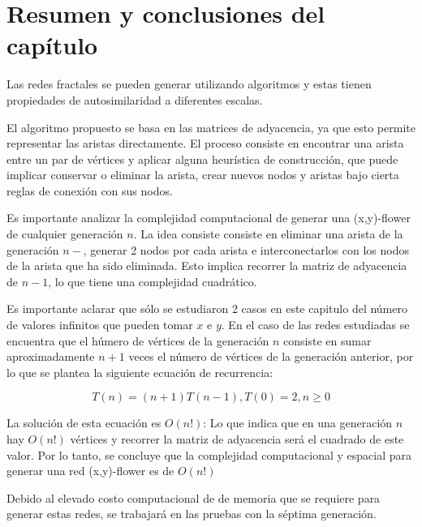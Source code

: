 \section{Resumen y conclusiones del capítulo}

Las redes fractales se pueden generar utilizando algoritmos y estas tienen propiedades de autosimilaridad a diferentes escalas.

El algoritmo propuesto se basa en las matrices de adyacencia, ya que esto permite representar las aristas directamente. El proceso consiste en encontrar una arista entre un par de vértices y aplicar alguna heurística de construcción, que puede implicar conservar o eliminar la arista, crear nuevos nodos y aristas bajo cierta reglas de conexión con sus nodos.

Es importante analizar la complejidad computacional de generar una (x,y)-flower de cualquier generación $n$. La idea consiste consiste en eliminar una arista de la generación $n-$, generar 2 nodos por cada arista e interconectarlos con los nodos de la arista que ha sido eliminada. Esto implica recorrer la matriz de adyacencia de $n-1$, lo que tiene una complejidad cuadrático.

Es importante aclarar que sólo se estudiaron 2 casos en este capitulo del número de valores infinitos que pueden tomar $x$ e $y$. En el caso de las redes estudiadas se encuentra que el húmero de vértices de la generación $n$ consiste en sumar aproximadamente $n+1$ veces el número de vértices de la generación anterior, por lo que se plantea la siguiente ecuación de recurrencia:

\begin{equation}
    T(n)=(n+1)T(n-1), T(0)=2, n \geq 0
\end{equation}

La solución de esta ecuación es $O(n!)$: Lo que indica que en una generación $n$ hay $O(n!)$ vértices y recorrer la matriz de adyacencia será el cuadrado de este valor. Por lo tanto, se concluye que la complejidad computacional y espacial para generar una red (x,y)-flower es de $O(n!)$

Debido al elevado costo computacional de de memoria que se requiere para generar estas redes, se trabajará en las pruebas con la séptima generación.
